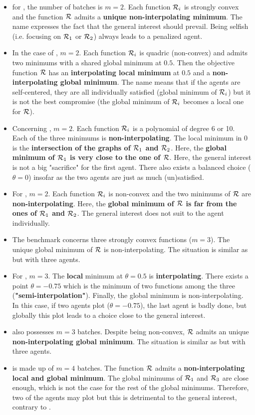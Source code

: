 \begin{itemize}
	\item for \exOne, the number of batches is $m=2$. Each function $\mathcal{R}_i$ is strongly convex and the function $\mathcal{R}$ admits a \textbf{unique non-interpolating minimum}. The name
          expresses the fact that the general interest should prevail. 
          Being selfish (i.e. focusing on $\mathcal{R}_1$ or $\mathcal{R}_2$)  always leads to a penalized agent.
	\item In the case of \exTwo, $m=2$. Each function $\mathcal{R}_i$ is quadric (non-convex) and admits two minimums with a shared global minimum at $0.5$. Then the objective function
          $\mathcal{R}$ has an \textbf{interpolating local minimum} at $0.5$ and a \textbf{non-interpolating global minimum}. The name means that if the agents are self-centered, they are all individually satisfied (global minimum of $\mathcal{R}_i$) but it is not the best compromise (the global minimum of $\mathcal{R}_i$ becomes a local one for $\mathcal{R}$).
	\item Concerning \exThree, $m=2$. Each function $\mathcal{R}_i$ is a polynomial of degree 6 or 10. Each of the three minimums is \textbf{non-interpolating}. The local minimum in 0 is the \textbf{intersection of the graphs of $\mathcal{R}_1$ and $\mathcal{R}_2$}. Here, the \textbf{global minimum of $\mathcal{R}_1$ is very close to the one of $\mathcal{R}$}. Here, the general interest is not a big "sacrifice" for the first agent. There also exists a balanced choice ($\theta=0$) insofar as the two agents are just as much (un)satisfied. 
	\item For \exFour, $m=2$. Each function $\mathcal{R}_i$ is non-convex and the two minimums of $\mathcal{R}$ are \textbf{non-interpolating}. Here, the \textbf{global minimum of $\mathcal{R}$ is far from the ones of $\mathcal{R}_1$ and $\mathcal{R}_2$}. The general interest does not suit to the agent individually. 
	\item The benchmark \exFive concerns three strongly convex functions ($m=3$). The unique global minimum of $\mathcal{R}$ is non-interpolating. The situation is similar as \exOne but with three agents.
	\item For \exSix, $m=3$. The \textbf{local} minimum at $\theta=0.5$ is \textbf{interpolating}. There exists a point $\theta=-0.75$ which is the minimum of two functions among the three (\textbf{"semi-interpolation"}). Finally, the global minimum is non-interpolating. In this case, if two agents plot ($\theta=-0.75$), the last agent is badly done, but globally this plot leads to a choice close to the general interest. 
	\item \exSeven also possesses $m=3$ batches. Despite being non-convex, $\mathcal{R}$ admits an unique \textbf{non-interpolating global minimum}. The situation is similar as \exFour but with three agents.
	\item \exHeight is made up of $m=4$ batches. The function $\mathcal{R}$ admits a \textbf{non-interpolating local and global minimum}. The global minimums of $\mathcal{R}_1$ and $\mathcal{R}_3$ are close enough, which is not the case for the rest of the global minimums. Therefore, two of the agents may plot but this is detrimental to the general interest, contrary to \exSix.      
\end{itemize}


